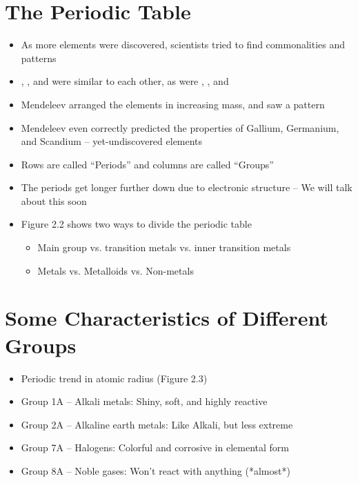 \documentclass[12pt, openany, letterpaper]{memoir}
\begin{document}
\section{The Periodic Table}
\begin{itemize}
	\item As more elements were discovered, scientists tried to find commonalities and patterns
	\item {}, , and  were similar to each other, as were , , and 
	\item Mendeleev arranged the elements in increasing mass, and saw a pattern
	\item Mendeleev even correctly predicted the properties of Gallium, Germanium, and Scandium -- yet-undiscovered elements
	\item Rows are called ``Periods'' and columns are called ``Groups''
	\item The periods get longer further down due to electronic structure -- We will talk about this soon
	\item Figure 2.2 shows two ways to divide the periodic table
	      \begin{itemize}
		      \item Main group vs. transition metals vs. inner transition metals
		      \item Metals vs. Metalloids vs. Non-metals
	      \end{itemize}
\end{itemize}

\section{Some Characteristics of Different Groups}
\begin{itemize}
	\item Periodic trend in atomic radius (Figure 2.3)
	\item Group 1A -- Alkali metals: Shiny, soft, and highly reactive
	\item Group 2A -- Alkaline earth metals: Like Alkali, but less extreme
	\item Group 7A -- Halogens: Colorful and corrosive in elemental form
	\item Group 8A -- Noble gases: Won't react with anything (*almost*)
\end{itemize}
\end{document}

